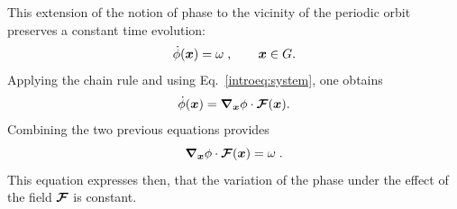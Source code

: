 This extension of the notion of phase to the vicinity of the periodic orbit preserves a constant time evolution:
\begin{equation}\label{introeq:phaseoscillator}
\dot \phi(\boldsymbol{x})=\omega\;, \qquad \boldsymbol{x} \in G.
\end{equation}
Applying the chain rule and using Eq.~\ref{introeq:system}, one obtains
\begin{equation}
\dot \phi(\boldsymbol{x})=\grad_{\boldsymbol{x}} \phi \cdot \boldsymbol{\mathcal{F}}(\boldsymbol{x}).
\end{equation}
Combining the two previous equations provides
\begin{equation}\label{introeq:phaseequality}
\grad_{\boldsymbol{x}} \phi \cdot \boldsymbol{\mathcal{F}}(\boldsymbol{x})=\omega\;.
\end{equation}
This equation expresses then, that the variation of the phase under the effect of the field $\boldsymbol{\mathcal{F}}$
is constant.

